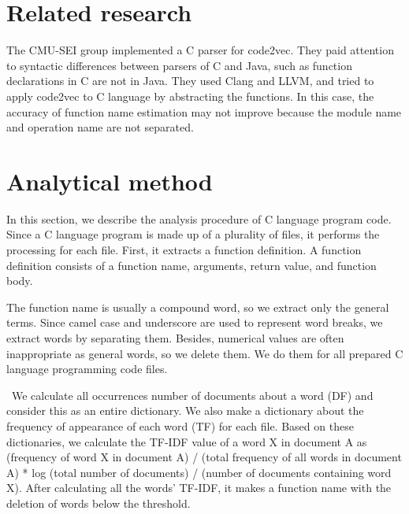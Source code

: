 \documentclass[JIP]{apris}
\begin{document}
\section{Related research}
The CMU-SEI group\cite{code2vec-c} implemented a C parser for code2vec.
They paid attention to syntactic differences between parsers of C and Java, such as function declarations in C are not in Java.
They used Clang and LLVM\cite{lattner2007clang}, and tried to apply code2vec to C language by abstracting the functions.
In this case, the accuracy of function name estimation may not improve because the module name and operation name are not separated.


\section{Analytical method}
In this section, we describe the analysis procedure of C language program code.
Since a C language program is made up of a plurality of files, it performs the processing for each file. First, it extracts a function definition. A function definition consists of a function name, arguments, return value, and function body.

The function name is usually a compound word, so we extract only the general terms. Since camel case and underscore are used to represent word breaks, we extract words by separating them.
Besides, numerical values ​​are often inappropriate as general words, so we delete them. We do them for all prepared C language programming code files.

 We calculate all occurrences number of documents about a word (DF) and consider this as an entire dictionary. We also make a dictionary about the frequency of appearance of each word (TF) for each file. Based on these dictionaries, we calculate the TF-IDF value of a word X in document A as (frequency of word X in document A) / (total frequency of all words in document A) * log (total number of documents) / (number of documents containing word X).
After calculating all the words' TF-IDF, it makes a function name with the deletion of words below the threshold.
\end{document}
